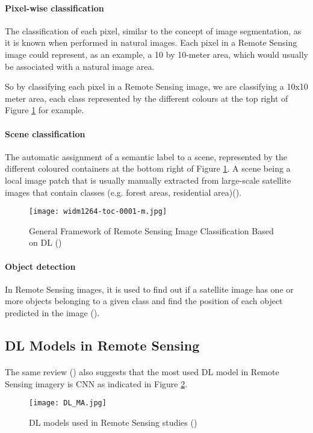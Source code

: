 \paragraph{Pixel-wise classification} The classification of each pixel, similar to the concept of image segmentation, as it is known when performed in natural images. Each pixel in a Remote Sensing image could represent, as an example, a 10 by 10-meter area, which would usually be associated with a natural image area. 

So by classifying each pixel in a Remote Sensing image, we are classifying a 10x10 meter area, each class represented by the different colours at the top right of Figure \ref{fig_img_class_frame} for example. 

\paragraph{Scene classification} The automatic assignment of a semantic label to a scene, represented by the different coloured containers at the bottom right of Figure \ref{fig_img_class_frame}. A scene being a local image patch that is usually manually extracted from large-scale satellite images that contain classes (e.g. forest areas, residential area)(\cite{https://doi.org/10.1002/widm.1264}).

    \begin{figure}[hbt!]
        \centering
        \texttt{[image: widm1264-toc-0001-m.jpg]}
        \caption{General Framework of Remote Sensing Image Classification Based on \gls{DL} (\cite{https://doi.org/10.1002/widm.1264})}
        \label{fig_img_class_frame}
    \end{figure}


\paragraph{Object detection} In Remote Sensing images, it is used to find out if a satellite image has one or more objects belonging to a given class and find the position of each object predicted in the image (\cite{CHENG201611}).

\subsection{\gls{DL} Models in Remote Sensing} \label{dl_models_rs}
\paragraph{}
The same review (\cite{MA2019166}) also suggests that the most used \gls{DL} model in Remote Sensing imagery is \gls{CNN} as indicated in Figure \ref{fig_dl_rs}.
    \begin{figure}[hbt!]
        \centering
        \texttt{[image: DL\_MA.jpg]}
        \caption{\gls{DL} models used in Remote Sensing studies (\cite{MA2019166})}
        \label{fig_dl_rs}
    \end{figure}
    
